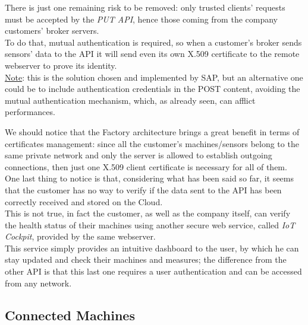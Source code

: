\documentclass[12pt]{report}
\begin{document}
{{There is just one remaining risk to be removed: only trusted clients' requests must be accepted by the \emph{PUT API}, hence those coming from the company customers' broker servers.\\
To do that, mutual authentication is required, so when a customer's broker sends sensors' data to the API it will send even its own X.509 certificate to the remote webserver to prove its identity.\\
\underline{Note}: this is the solution chosen and implemented by SAP, but an alternative one could be to include authentication credentials in the POST content, avoiding the mutual authentication mechanism, which, as already seen, can afflict performances.

We should notice that the Factory architecture brings a great benefit in terms of certificates management: since all the customer's machines/sensors belong to the same private network and only the server is allowed to establish outgoing connections, then just one X.509 client certificate is necessary for all of them.\\

One last thing to notice is that, considering what has been said so far, it seems that the customer has no way to verify if the data sent to the API has been correctly received and stored on the Cloud.\\
This is not true, in fact the customer, as well as the company itself, can verify the health status of their machines using another secure web service, called \emph{IoT Cockpit}, provided by the same webserver.\\
This service simply provides an intuitive dashboard to the user, by which he can stay updated and check their machines and measures; the difference from the other API is that this last one requires a user authentication and can be accessed from any network.\\


\subsection{Connected Machines}

}}
\end{document}
